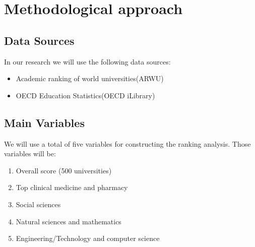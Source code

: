 \section{Methodological approach}\label{sec:approach}

\subsection{Data Sources}

In our research we will use the following data sources:

\begin{itemize}
	\item Academic ranking of world universities(ARWU) %
	\item OECD Education Statistics(OECD iLibrary) %
\end{itemize}

\subsection{Main Variables}
We will use a total of five variables for constructing the ranking analysis. Those variables will be:
\begin{enumerate}
	\item Overall score (500 universities)
	\item Top clinical medicine and pharmacy
	\item Social sciences
	\item Natural sciences and mathematics
	\item Engineering/Technology and computer science
\end{enumerate}

